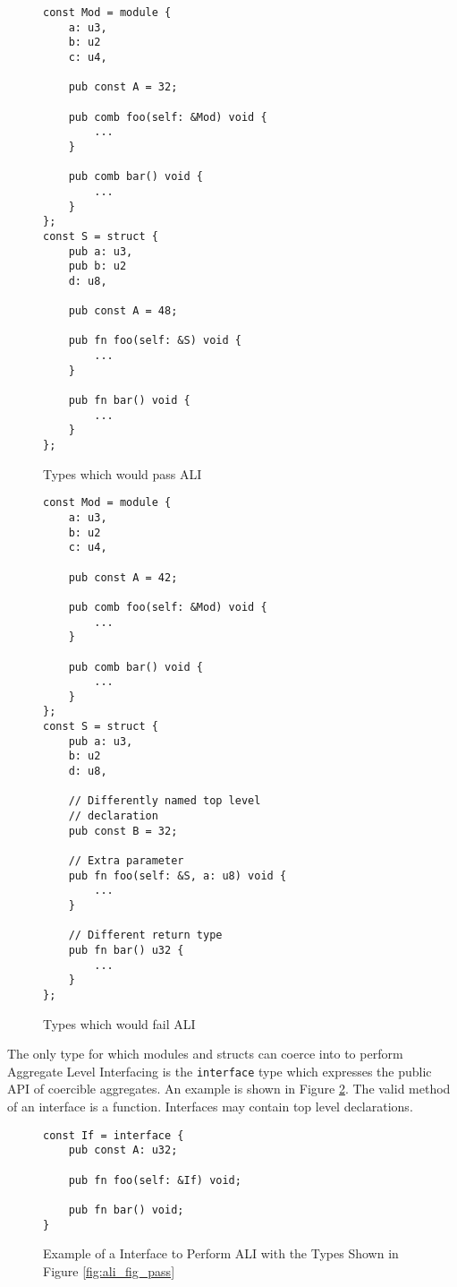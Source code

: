 \documentclass[10pt]{article}
\begin{document}
\begin{figure}[H]
	\begin{multicols}{2}
		\begin{verbatim}
const Mod = module {
    a: u3,
    b: u2
    c: u4,

    pub const A = 32;

    pub comb foo(self: &Mod) void {
        ...
    }

    pub comb bar() void {
        ...
    }
};
const S = struct {
    pub a: u3,
    pub b: u2
    d: u8,

    pub const A = 48;

    pub fn foo(self: &S) void {
        ...
    }

    pub fn bar() void {
        ...
    }
};
        \end{verbatim}
		\vspace*{-5mm}
		\caption{Types which would pass ALI}
		\label{fig:ali_fig_pass}
		\columnbreak
		\begin{verbatim}
const Mod = module {
    a: u3,
    b: u2
    c: u4,

    pub const A = 42;

    pub comb foo(self: &Mod) void {
        ...
    }

    pub comb bar() void {
        ...
    }
};
const S = struct {
    pub a: u3,
    b: u2
    d: u8,

    // Differently named top level
    // declaration
    pub const B = 32;

    // Extra parameter
    pub fn foo(self: &S, a: u8) void {
        ...
    }

    // Different return type
    pub fn bar() u32 {
        ...
    }
};
    \end{verbatim}
		\vspace*{-5mm}
		\caption{Types which would fail ALI}
		\label{fig:ali_fig_fail}
	\end{multicols}
\end{figure}

The only type for which modules and structs can coerce into to perform Aggregate Level Interfacing
is the \verb|interface| type which expresses the public API of coercible aggregates. An example is
shown in Figure \ref{fig:ali_interface}. The valid method of an interface is a function. Interfaces
may contain top level declarations.

\begin{figure}[H]
	\begin{verbatim}
const If = interface {
    pub const A: u32;

    pub fn foo(self: &If) void;

    pub fn bar() void;
}
    \end{verbatim}
	\vspace*{-5mm}
	\caption{Example of a Interface to Perform ALI with the Types Shown in Figure \ref{fig:ali_fig_pass}}
	\label{fig:ali_interface}
\end{figure}
\end{document}
